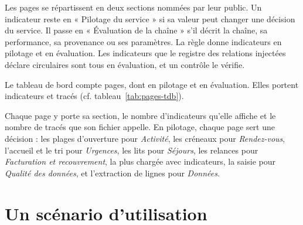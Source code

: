 Les pages se répartissent en deux sections nommées par leur public. Un indicateur reste en
« Pilotage du service » si sa valeur peut changer une décision du service. Il passe en « Évaluation
de la chaîne » s'il décrit la chaîne, sa performance, sa provenance ou ses paramètres. La règle
donne  indicateurs en pilotage et
 en évaluation. Les indicateurs que le registre des relations
injectées déclare circulaires sont tous en évaluation, et un contrôle le vérifie.

Le tableau de bord compte  pages, dont  en pilotage
et  en évaluation. Elles portent  indicateurs et
 tracés (cf. tableau~\ref{tab:pages-tdb}).

\begin{table}[htbp]
\centering
\caption[Les pages du tableau de bord]{Les pages du tableau de bord, dans l'ordre du registre des indicateurs}\label{tab:pages-tdb}
\footnotesize
{}
\end{table}

Chaque page y porte sa section, le nombre d'indicateurs qu'elle affiche et le nombre de tracés que
son fichier appelle. En pilotage, chaque page sert une décision : les plages d'ouverture pour
\emph{Activité}, les créneaux pour \emph{Rendez-vous}, l'accueil et le tri pour \emph{Urgences}, les
lits pour \emph{Séjours}, les relances pour \emph{Facturation et recouvrement}, la plus chargée avec
 indicateurs, la saisie pour
\emph{Qualité des données}, et l'extraction de lignes pour \emph{Données}.

\section{Un scénario d'utilisation}

